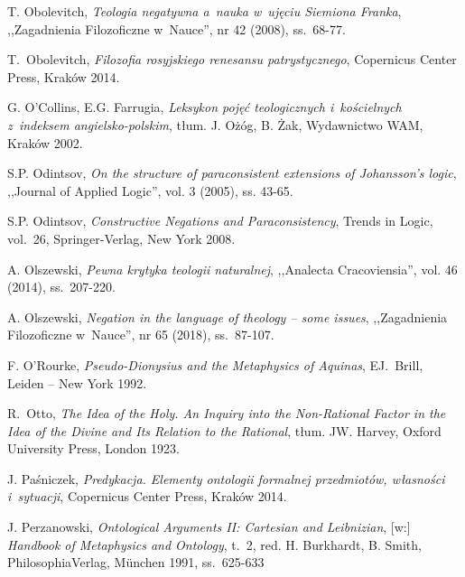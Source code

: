 \begin{thebibliography}{100}
T. Obolevitch, \textit{Teologia negatywna a~nauka w~ujęciu Siemiona Franka}, ,,Zagadnienia Filozoficzne w~Nauce'', nr 42 (2008), ss.~68-77.

T.~Obolevitch, \textit{Filozofia rosyjskiego renesansu patrystycznego}, Copernicus Center Press, Kraków 2014.

G. O'Collins, E.G. Farrugia, \textit{Leksykon pojęć teologicznych i~kościelnych z~indeksem angielsko-polskim}, tłum. J. Ożóg, B. Żak, Wydawnictwo WAM, Kraków 2002.

S.P. Odintsov, \textit{On the structure of paraconsistent extensions of Johansson's logic}, ,,Journal of Applied Logic'', vol. 3 (2005), ss. 43-65.

S.P. Odintsov, \textit{Constructive Negations and Paraconsistency}, Trends in Logic, vol.~26, Springer-Verlag, New York 2008.

A. Olszewski, \textit{Pewna krytyka teologii naturalnej}, ,,Analecta Cracoviensia'', vol. 46 (2014), ss.~207-220.

A. Olszewski, \textit{Negation in the language of theology -- some issues}, ,,Zagadnienia Filozoficzne w~Nauce'', nr 65 (2018), ss.~87-107.

F. O'Rourke, \textit{Pseudo-Dionysius and the Metaphysics of Aquinas}, EJ.~Brill, Leiden -- New York 1992.

R.~Otto, \textit{The Idea of the Holy. An Inquiry into the Non-Rational Factor in the Idea of the Divine and Its Relation to the Rational}, tłum. JW. Harvey, Oxford University Press, London 1923.



J. Paśniczek, \textit{Predykacja. Elementy ontologii formalnej przedmiotów, własności i~sytuacji}, Copernicus Center Press, Kraków 2014.

J. Perzanowski, \textit{Ontological Arguments II: Cartesian and Leibnizian}, [w:] \textit{Handbook of Metaphysics and Ontology},
t.~2, red. H. Burkhardt, B. Smith,  PhilosophiaVerlag, München 1991, ss.~625-633


\end{thebibliography}
